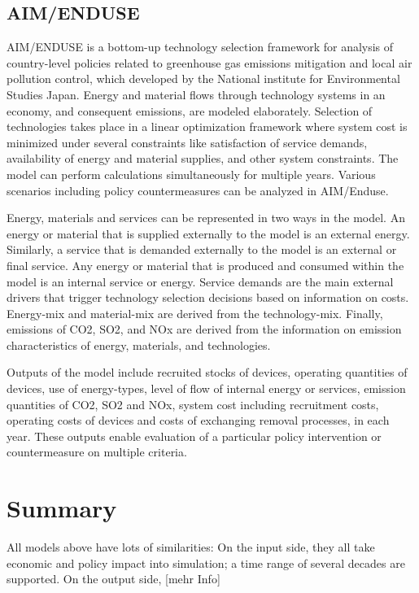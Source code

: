 \documentclass[lettersize,journal]{IEEEtran}
\begin{document}
  \subsection{AIM/ENDUSE}
  AIM/ENDUSE  is a bottom-up technology selection framework for analysis of country-level policies related to greenhouse gas emissions mitigation and local air pollution control, which developed by the National institute for Environmental Studies Japan. Energy and material flows through technology systems in an economy, and consequent emissions, are modeled elaborately. Selection of technologies takes place in a linear optimization framework where system cost is minimized under several constraints like satisfaction of service demands, availability of energy and material supplies, and other system constraints.  The model can perform calculations simultaneously for multiple years. Various scenarios including policy countermeasures can be analyzed in AIM/Enduse. 

  Energy, materials and services can be represented in two ways in the model. An energy or material that is supplied externally to the model is an external energy. Similarly, a service that is demanded externally to the model is an external or final service. Any energy or material that is produced and consumed within the model is an internal service or energy. Service demands are the main external drivers that trigger technology selection decisions based on information on costs. Energy-mix and material-mix are derived from the technology-mix. Finally, emissions of CO2, SO2, and NOx are derived from the information on emission characteristics of energy, materials, and technologies. 

  Outputs of the model include recruited stocks of devices, operating quantities of devices, use of energy-types, level of flow of internal energy or services, emission quantities of CO2, SO2 and NOx, system cost including recruitment costs, operating costs of devices and costs of exchanging removal processes, in each year. These outputs enable evaluation of a particular policy intervention or countermeasure on multiple criteria.\cite{aim}



\section{Summary}
All models above have lots of similarities: On the input side, they all take economic and policy impact into simulation; a time range of several decades are supported. On the output side, 
[mehr Info]
\end{document}
